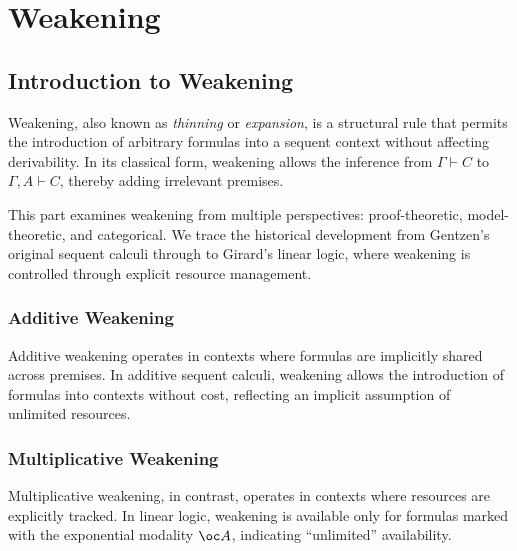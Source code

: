 

\part{Weakening}

\chapter*{Introduction to Weakening}
\label{sec-weakening-intro}
{}

Weakening, also known as \emph{thinning} or \emph{expansion}, is a structural rule that permits the introduction of arbitrary formulas into a sequent context without affecting derivability. In its classical form, weakening allows the inference from $\Gamma \vdash C$ to $\Gamma, A \vdash C$, thereby adding irrelevant premises.

This part examines weakening from multiple perspectives: proof-theoretic, model-theoretic, and categorical. We trace the historical development from Gentzen's original sequent calculi through to Girard's linear logic, where weakening is controlled through explicit resource management.

\section*{Additive Weakening}
\label{sec-weakening-additive}

Additive weakening operates in contexts where formulas are implicitly shared across premises. In additive sequent calculi, weakening allows the introduction of formulas into contexts without cost, reflecting an implicit assumption of unlimited resources.

\section*{Multiplicative Weakening}
\label{sec-weakening-multiplicative}

Multiplicative weakening, in contrast, operates in contexts where resources are explicitly tracked. In linear logic, weakening is available only for formulas marked with the exponential modality $\oc A$, indicating ``unlimited'' availability.

